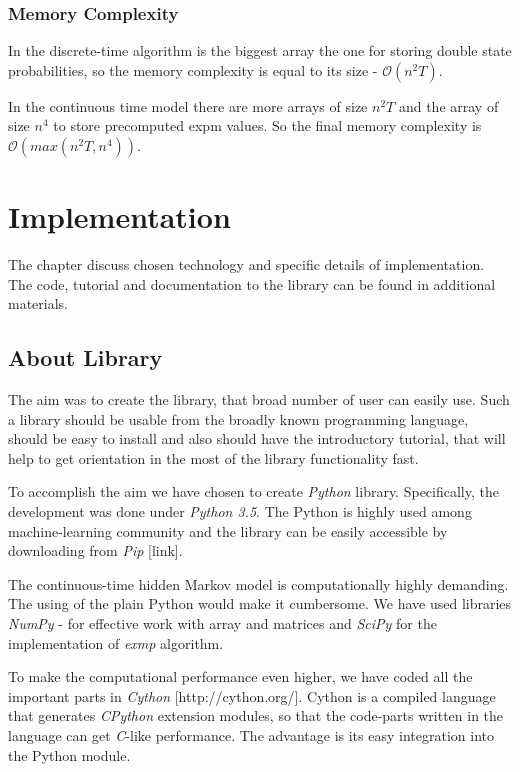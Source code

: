 \documentclass[thesis=M,english]{FITthesis}[2012/10/20]
\begin{document}
\subsection{Memory Complexity}
In the discrete-time algorithm is the biggest array the one for storing double state probabilities, so the memory complexity is equal to its size - $\mathcal{O}(n^2T)$. 

In the continuous time model there are more arrays of size $n^2T$ and the array of size $n^4$ to store precomputed expm values. So the final memory complexity is $\mathcal{O}( max( n^2T, n^4 ))$.

\chapter{Implementation}

The chapter discuss chosen technology and specific details of implementation. 
The code, tutorial and documentation to the library can be found in additional materials.

\section{About Library}

The aim was to create the library, that broad number of user can easily use. Such a library should be usable from the broadly known programming language, should be easy to install and also should have the introductory tutorial, that will help to get orientation in the most of the library functionality fast. 

To accomplish the aim we have chosen to create \textit{Python} library. Specifically, the development was done under \textit{Python 3.5}. The Python is highly used among machine-learning community and the library can be easily accessible by downloading from \textit{Pip} [link]. 

The continuous-time hidden Markov model is computationally highly demanding. The using of the plain Python would make it cumbersome. We have used libraries \textit{NumPy} - for effective work with array and matrices and \textit{SciPy} for the implementation of \textit{exmp} algorithm. 

To make the computational performance even higher, we have coded all the important parts in \textit{Cython} [http://cython.org/]. Cython is a compiled language that generates \textit{CPython} extension modules, so that the code-parts written in the language can get \textit{C}-like performance. The advantage is its easy integration into the Python module.
\end{document}
